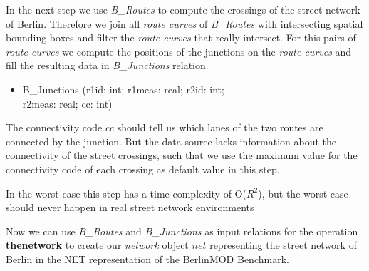 \documentclass[a4paper]{article}
\newcommand{\bmodb} {BerlinMOD Benchmark}
\newcommand{\op}[1]{\textbf{#1}}
\newcommand{\dt}[1]{\textsl{\underline{#1}}}
\begin{document}
In the next step we use \textit{B\_Routes} to compute the crossings of the street
network of Berlin. Therefore we join all \textit{route curves} of \textit{B\_Routes} with
intersecting spatial bounding boxes and filter the \textit{route curves} that
really intersect. For this pairs of \textit{route curves} we compute the positions
of the junctions on the \textit{route curves} and fill the resulting data in
\textit{B\_Junctions} relation.
\begin{ttfamily}
\begin{itemize}
\item []B\_Junctions (r1id: int; r1meas: real; r2id: int;\\
r2meas: real; cc: int)
\end{itemize}
\end{ttfamily}
The connectivity code $cc$ should tell us which lanes of the two routes are
connected by the junction. But the data source lacks information about the
connectivity of the street crossings, such that we use the maximum value for the
connectivity code of each crossing as default value in this step.

In the worst case this step has a time complexity of O($R^2$), but the worst
case should never happen in real street network environments

Now we can use \textit{B\_Routes} and \textit{B\_Junctions} as input relations for the
operation \op{thenetwork} to create our \dt{network} object $net$ representing
the street network of Berlin in the NET representation of the \bmodb{}.
\end{document}
